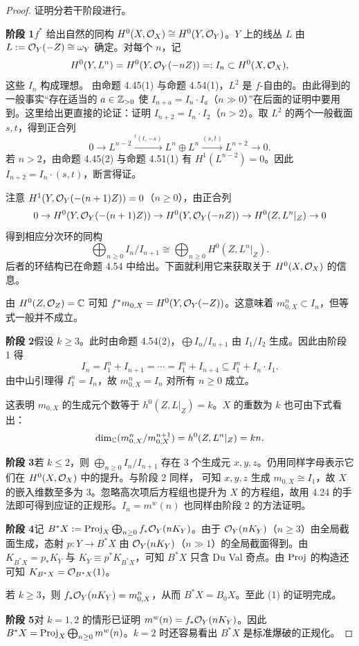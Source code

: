 \begin{proof}
证明分若干阶段进行。

\textbf{阶段 1}\quad $f^*$ 给出自然的同构 $H^0(X,\mathcal{O}_X)\cong H^0(Y,\mathcal{O}_Y)$。$Y$ 上的线丛 $L$ 由 $L:=\mathcal{O}_Y(-Z)\cong\omega_Y$ 确定。对每个 $n$，记
\[ H^0(Y,L^n)=H^0(Y,\mathcal{O}_Y(-nZ))=:I_n\subset H^0(X,\mathcal{O}_X), \]
这些 $I_n$ 构成理想。
由命题 4.45(1) 与命题 4.54(1)，$L^2$ 是 $f$-自由的。由此得到的一般事实“存在适当的 $a\in\mathbb{Z}_{>0}$ 使 $I_{n+a}=I_n\cdot I_a$（$n\gg0$）”在后面的证明中要用到。这里给出更直接的论证：证明 $I_{n+2}=I_n\cdot I_2$（$n>2$）。取 $L^2$ 的两个一般截面 $s,t$，得到正合列
\[ 0\to L^{n-2}\xrightarrow{{}^{t}(t,-s)}L^n\oplus L^n\xrightarrow{(s,t)}L^{n+2}\to0. \]
若 $n>2$，由命题 4.45(2) 与命题 4.51(1) 有 $H^1(L^{n-2})=0$。因此 $I_{n+2}=I_n\cdot(s,t)$，断言得证。

注意 $H^1(Y,\mathcal{O}_Y(-(n+1)Z))=0$（$n\ge0$），由正合列
\[ 0\to H^0(Y,\mathcal{O}_Y(-(n+1)Z))\to H^0(Y,\mathcal{O}_Y(-nZ))\to H^0(Z,L^n|_Z)\to0 \]
得到相应分次环的同构
\[ \bigoplus_{n\ge0}I_n/I_{n+1}\cong\bigoplus_{n\ge0}H^0(Z,L^n|_Z). \]
后者的环结构已在命题 4.54 中给出。下面就利用它来获取关于 $H^0(X,\mathcal{O}_X)$ 的信息。

由 $H^0(Z,\mathcal{O}_Z)=\mathbb{C}$ 可知 $f^*m_{0,X}=H^0(Y,\mathcal{O}_Y(-Z))$。这意味着 $m_{0,X}^n\subset I_n$，但等式一般并不成立。

\textbf{阶段 2}\quad 假设 $k\ge3$。此时由命题 4.54(2)，$\bigoplus I_n/I_{n+1}$ 由 $I_1/I_2$ 生成。因此由阶段 1 得
\[ I_n=I_1^n+I_{n+1}=\cdots=I_1^n+I_{n+4}\subseteq I_1^n+I_n\cdot I_1. \]
由中山引理得 $I_1^n=I_n$，故 $m_{0,X}^n=I_n$ 对所有 $n\ge0$ 成立。

这表明 $m_{0,X}$ 的生成元个数等于 $h^0(Z,L|_Z)=k$。$X$ 的重数为 $k$ 也可由下式看出：
\[ \dim_{\mathbb{C}}(m_{0,X}^n/m_{0,X}^{n+1})=h^0(Z,L^n|_Z)=kn. \]

\textbf{阶段 3}\quad 若 $k\le2$，则 $\bigoplus_{n\ge0}I_n/I_{n+1}$ 存在 3 个生成元 $x,y,z$。仍用同样字母表示它们在 $H^0(X,\mathcal{O}_X)$ 中的提升。与阶段 2 同样，
可知 $x,y,z$ 生成 $m_{0,X}\cong I_1$，故 $X$ 的嵌入维数至多为 3。忽略高次项后方程组也提升为 $X$ 的方程组，故用 4.24 的手法即可得到应证的正规形。$I_n=m^w(n)$ 也同样由阶段 2 的方法证明。

\textbf{阶段 4}\quad 记 $B^*X:=\operatorname{Proj}_X\bigoplus_{n\ge0}f_*\mathcal{O}_Y(nK_Y)$。由于 $\mathcal{O}_Y(nK_Y)$（$n\ge3$）由全局截面生成，态射 $p:Y\to B^*X$ 由 $\mathcal{O}_Y(nK_Y)$（$n\gg1$）的全局截面得到。由 $K_{B^*X}=p_*K_Y$ 与 $K_Y\equiv p^*K_{B^*X}$，可知 $B^*X$ 只含 Du Val 奇点。由 $\operatorname{Proj}$ 的构造还可知 $K_{B^*X}=\mathcal{O}_{B^*X}(1)$。

若 $k\ge3$，则 $f_*\mathcal{O}_Y(nK_Y)=m_{0,X}^n$，从而 $B^*X=B_0X$。至此 (1) 的证明完成。

\textbf{阶段 5}\quad 对 $k=1,2$ 的情形已证明 $m^w(n)=f_*\mathcal{O}_Y(nK_Y)$。因此 $B^*X=\operatorname{Proj}_X\bigoplus_{n\ge0}m^w(n)$。$k=2$ 时还容易看出 $B^*X$ 是标准爆破的正规化。
\end{proof}

